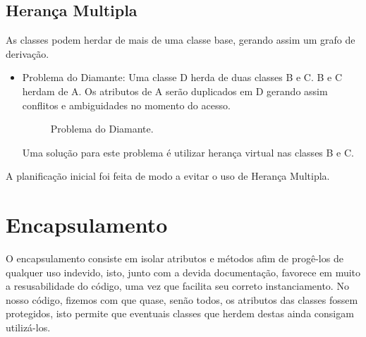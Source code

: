 \documentclass[rel_mlp]{iiufrgs}
\newcommand{\fonte}[1]{\\Fonte: {#1}}
\begin{document}
\subsection{Herança Multipla} 	
As classes podem herdar de mais de uma classe base, gerando assim um grafo de derivação.
 \begin{itemize}
   \item Problema do Diamante: Uma classe D herda de duas classes B e C. B e C herdam de A. Os atributos de A serão duplicados em D gerando   assim conflitos e ambiguidades no momento do acesso. 
\begin{figure}[htb]
    \centering
    \label{fig:figura3}
    \caption{Problema do Diamante.}
\end{figure}
   
   
   
   Uma solução para este problema  é utilizar herança virtual nas classes B e C.
 \end{itemize}  	
 A planificação inicial foi feita de modo a evitar o uso de Herança Multipla.
 
 
 
\section{Encapsulamento} 
 
	O encapsulamento consiste em isolar atributos e métodos afim de progê-los de qualquer uso indevido, isto, junto com a devida documentação, favorece em muito a resusabilidade do código, uma vez que facilita seu correto instanciamento.
	No nosso código, fizemos com que quase, senão todos, os atributos das classes fossem protegidos, isto permite que eventuais classes que herdem destas ainda consigam utilizá-los. 
 
 
 
 
 
\end{document}
